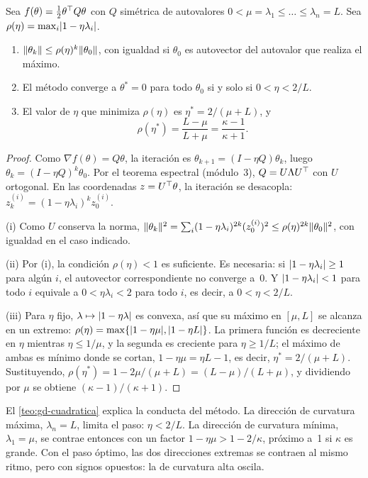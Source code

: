 \begin{teorema}\label{teo:gd-cuadratica}
Sea $f(\theta)=\tfrac12\theta^{\top} Q\theta$ con $Q$ simétrica de autovalores $0<\mu=\lambda_1\le\dots\le\lambda_n=L$. Sea $\rho(\eta)=\max_i\lvert1-\eta\lambda_i\rvert$.
\begin{enumerate}
  \item $\lVert\theta_k\rVert\le\rho(\eta)^{k}\lVert\theta_0\rVert$, con igualdad si $\theta_0$ es autovector del autovalor que realiza el máximo.
  \item El método converge a $\theta^{\ast}=0$ para todo $\theta_0$ si y solo si $0<\eta<2/L$.
  \item El valor de $\eta$ que minimiza $\rho(\eta)$ es $\eta^{\ast}=2/(\mu+L)$, y
  \[
  \rho(\eta^{\ast})=\frac{L-\mu}{L+\mu}=\frac{\kappa-1}{\kappa+1}.
  \]
\end{enumerate}
\end{teorema}

\begin{proof}
Como $\nabla f(\theta)=Q\theta$, la iteración es $\theta_{k+1}=(I-\eta Q)\theta_k$, luego $\theta_k=(I-\eta Q)^{k}\theta_0$. Por el teorema espectral (módulo~3), $Q=U\Lambda U^{\top}$ con $U$ ortogonal. En las coordenadas $z=U^{\top}\theta$, la iteración se desacopla: $z^{(i)}_{k}=(1-\eta\lambda_i)^{k}z^{(i)}_{0}$.

(i) Como $U$ conserva la norma, $\lVert\theta_k\rVert^{2}=\sum_i(1-\eta\lambda_i)^{2k}(z^{(i)}_0)^{2}\le\rho(\eta)^{2k}\lVert\theta_0\rVert^{2}$, con igualdad en el caso indicado.

(ii) Por (i), la condición $\rho(\eta)<1$ es suficiente. Es necesaria: si $\lvert1-\eta\lambda_i\rvert\ge 1$ para algún $i$, el autovector correspondiente no converge a~0. Y $\lvert1-\eta\lambda_i\rvert<1$ para todo $i$ equivale a $0<\eta\lambda_i<2$ para todo $i$, es decir, a $0<\eta<2/L$.

(iii) Para $\eta$ fijo, $\lambda\mapsto\lvert1-\eta\lambda\rvert$ es convexa, así que su máximo en $[\mu,L]$ se alcanza en un extremo: $\rho(\eta)=\max\{\lvert1-\eta\mu\rvert,\lvert1-\eta L\rvert\}$. La primera función es decreciente en $\eta$ mientras $\eta\le 1/\mu$, y la segunda es creciente para $\eta\ge 1/L$; el máximo de ambas es mínimo donde se cortan, $1-\eta\mu=\eta L-1$, es decir, $\eta^{\ast}=2/(\mu+L)$. Sustituyendo, $\rho(\eta^{\ast})=1-2\mu/(\mu+L)=(L-\mu)/(L+\mu)$, y dividiendo por $\mu$ se obtiene $(\kappa-1)/(\kappa+1)$.
\end{proof}

\begin{observacion}
El \cref{teo:gd-cuadratica} explica la conducta del método. La dirección de curvatura máxima, $\lambda_n=L$, limita el paso: $\eta<2/L$. La dirección de curvatura mínima, $\lambda_1=\mu$, se contrae entonces con un factor $1-\eta\mu>1-2/\kappa$, próximo a~1 si $\kappa$ es grande. Con el paso óptimo, las dos direcciones extremas se contraen al mismo ritmo, pero con signos opuestos: la de curvatura alta oscila.
\end{observacion}

